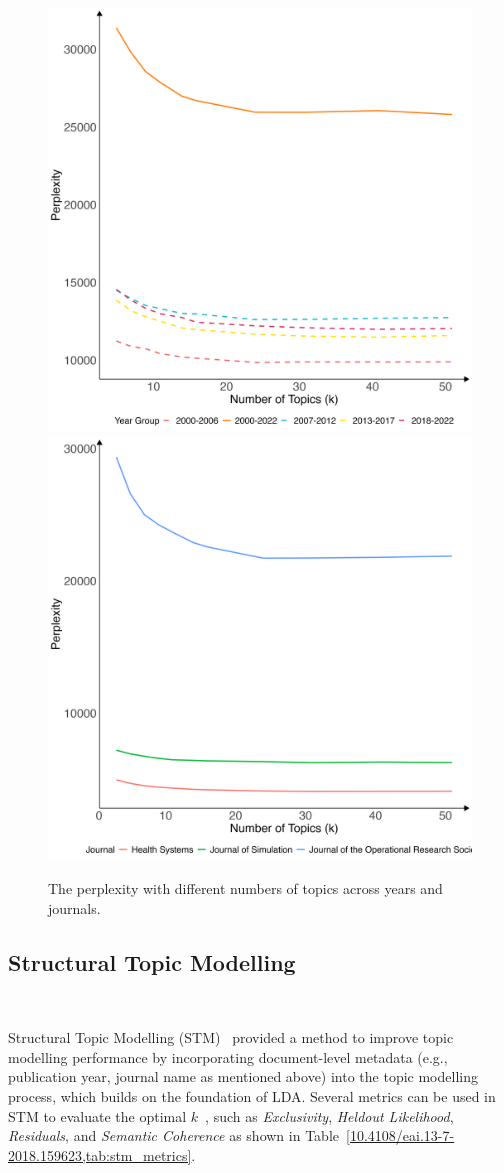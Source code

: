 \documentclass[9pt,twocolumn,twoside]{pnas-new}
\begin{document}
\begin{figure}[!tbhp]
\centering

\includegraphics[width=0.49\linewidth]{bag_words/Perplexity_year.png}
\includegraphics[width=0.49\linewidth]{bag_words/Perplexity_journal.png}

\caption{The perplexity with different numbers of topics across years and journals.}
\label{fig:perplexity}
\end{figure}

\subsection*{Structural Topic Modelling} \

Structural Topic Modelling (STM)~\cite{10.4108/eai.13-7-2018.159623} provided a method to improve topic modelling performance by incorporating document-level metadata (e.g., publication year, journal name as mentioned above) into the topic modelling process, which builds on the foundation of LDA.  Several metrics can be used in STM to evaluate the optimal $k$~\cite{stm}, such as \textit{Exclusivity}, \textit{Heldout Likelihood}, \textit{Residuals}, and \textit{Semantic Coherence} as shown in Table~\ref{10.4108/eai.13-7-2018.159623,tab:stm_metrics}.
\end{document}
